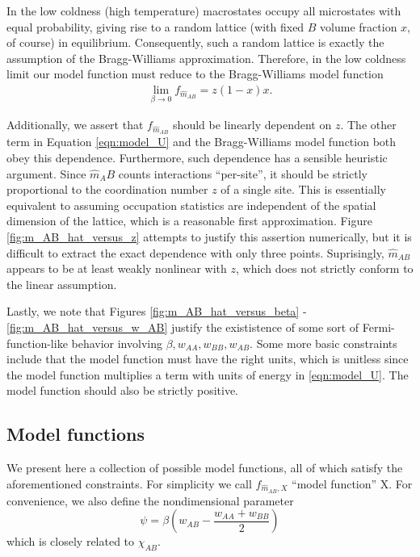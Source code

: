 \documentclass[10pt]{article}
\begin{document}
In the low coldness (high temperature) macrostates occupy all microstates with equal probability, giving rise to a random lattice (with fixed $B$ volume fraction $x$, of course) in equilibrium.
Consequently, such a random lattice is exactly the assumption of the Bragg-Williams approximation.
Therefore, in the low coldness limit our model function must reduce to the Bragg-Williams model function
\begin{align}
    \lim_{\beta \rightarrow 0} f_{\hat{m}_{AB}} = z (1-x) x.
\end{align}

Additionally, we assert that $f_{\hat{m}_{AB}}$ should be linearly dependent on $z$.
The other term in Equation \ref{eqn:model_U} and the Bragg-Williams model function both obey this dependence.
Furthermore, such dependence has a sensible heuristic argument.
Since $\hat{m}_AB$ counts interactions ``per-site'', it should be strictly proportional to the coordination number $z$ of a single site.
This is essentially equivalent to assuming occupation statistics are independent of the spatial dimension of the lattice, which is a reasonable first approximation.
Figure \ref{fig:m_AB_hat_versus_z} attempts to justify this assertion numerically, but it is difficult to extract the exact dependence with only three points.
Suprisingly, $\hat{m}_{AB}$ appears to be at least weakly nonlinear with $z$, which does not strictly conform to the linear assumption.

Lastly, we note that Figures \ref{fig:m_AB_hat_versus_beta} - \ref{fig:m_AB_hat_versus_w_AB} justify the exististence of some sort of Fermi-function-like behavior involving $\beta,w_{AA},w_{BB},w_{AB}$.
Some more basic constraints include that the model function must have the right units, which is unitless since the model function multiplies a term with units of energy in \ref{eqn:model_U}.
The model function should also be strictly positive.

\subsection{Model functions}
We present here a collection of possible model functions, all of which satisfy the aforementioned constraints.
For simplicity we call $f_{\hat{m}_{AB},X}$ ``model function'' X.
For convenience, we also define the nondimensional parameter
\begin{equation}
    \psi = \beta \left(w_{AB} - \frac{w_{AA} + w_{BB}}{2} \right)
\end{equation}
which is closely related to $\chi_{AB}$.
\end{document}
